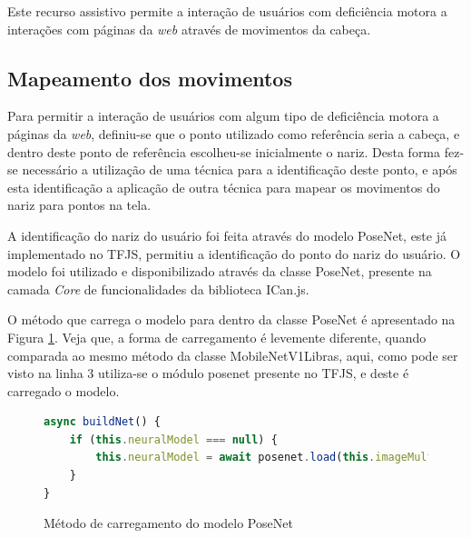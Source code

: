 \par Este recurso assistivo permite a interação de usuários com deficiência motora a interações com páginas da \textit{web} através de movimentos da cabeça.



\subsection{Mapeamento dos movimentos}

\par Para permitir a interação de usuários com algum tipo de deficiência motora a páginas da \textit{web}, definiu-se que o ponto utilizado como referência seria a cabeça, e dentro deste ponto de referência escolheu-se inicialmente o nariz. Desta forma fez-se necessário a utilização de uma técnica para a identificação deste ponto, e após esta identificação a aplicação de outra técnica para mapear os movimentos do nariz para pontos na tela.

\par A identificação do nariz do usuário foi feita através do modelo PoseNet, este já implementado no TFJS, permitiu a identificação do ponto do nariz do usuário. O modelo foi utilizado e disponibilizado através da classe PoseNet, presente na camada \textit{Core} de funcionalidades da biblioteca ICan.js. 

\par O método que carrega o modelo para dentro da classe PoseNet é apresentado na Figura \ref{figure:funcao_carregamento_posenet}. Veja que, a forma de carregamento é levemente diferente, quando comparada ao mesmo método da classe MobileNetV1Libras, aqui, como pode ser visto na linha 3 utiliza-se o módulo posenet presente no TFJS, e deste é carregado o modelo.

\begin{figure}[H]
    \centering
    \begin{lstlisting}[language=JavaScript]
async buildNet() {
    if (this.neuralModel === null) {
        this.neuralModel = await posenet.load(this.imageMultiplier);
    }
}
    \end{lstlisting}
    \caption{Método de carregamento do modelo PoseNet}
    \label{figure:funcao_carregamento_posenet}
\end{figure}

